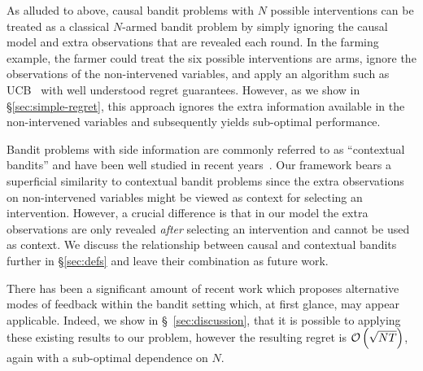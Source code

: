 As alluded to above, causal bandit problems with $N$ possible interventions can be treated as a classical $N$-armed bandit problem by simply ignoring the causal model and extra observations that are revealed each round.
In the farming example, the farmer could treat the six possible interventions are arms, ignore the observations of the non-intervened variables, and apply an algorithm such as UCB~\cite{Auer1995} with well understood regret guarantees.
However, as we show in \S\ref{sec:simple-regret}, this approach ignores the extra information available in the non-intervened variables and subsequently yields sub-optimal performance.

Bandit problems with side information are commonly referred to as ``contextual bandits'' and have been well studied in recent years~\cite{Langford2008,Agarwal2014}.
Our framework bears a superficial similarity to contextual bandit problems since the extra observations on non-intervened variables might be viewed as context for selecting an intervention. 
However, a crucial difference is that in our model the extra observations are only revealed \emph{after} selecting an intervention and cannot be used as context.
We discuss the relationship between causal and contextual bandits further in \S\ref{sec:defs} and leave their combination as future work.

There has been a significant amount of recent work which proposes alternative modes of feedback within the bandit setting \citep{Alon2015} which, at first glance, may appear applicable. Indeed, we show in \S~\ref{sec:discussion}, that it is possible to applying these existing results to our problem, however the resulting regret is $\mathcal{O}\left( \sqrt{NT} \right)$, again with a sub-optimal dependence on $N$.





